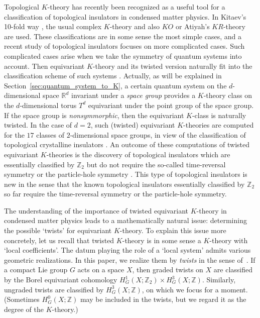 \documentclass[pdftex]{sigma}
\theoremstyle{definition}
\newcommand{\R}{\mathbb{R}}
\newcommand{\Z}{\mathbb{Z}}
\begin{document}
Topological $K$-theory has recently been recognized as a useful tool for a classif\/ication of topological insulators in condensed matter physics. In Kitaev's 10-fold way \cite{Ki}, the usual complex $K$-theory and also $KO$ or Atiyah's $KR$-theory are used. These classif\/ications are in some sense the most simple cases, and a recent study of topological insulators focuses on more complicated cases. Such complicated cases arise when we take the symmetry of quantum systems into account. Then equivariant $K$-theory and its twisted version naturally f\/it into the classif\/ication scheme of such systems \cite{F-M}. Actually, as will be explained in Section~\ref{sec:quantum_system_to_K}, a certain quantum system on the $d$-dimensional space $\R^d$ invariant under a \textit{space group} provides a $K$-theory class on the $d$-dimensional torus $T^d$ equivariant under the point group of the space group. If the space group is \textit{nonsymmorphic}, then the equivariant $K$-class is naturally twisted. In the case of $d = 2$, such (twisted) equivariant $K$-theories are computed for the $17$ classes of $2$-dimensional space groups, in view of the classif\/ication of topological crystalline insulators \cite{SSG2, SSG3}. An outcome of these computations of twisted equivariant $K$-theories is the discovery of topological insulators which are essentially classif\/ied by $\Z_2$ but do not require the so-called time-reversal symmetry or the particle-hole symmetry \cite{SSG1}. This type of topological insulators is new in the sense that the known topological insulators essentially classif\/ied by $\Z_2$ so far require the time-reversal symmetry or the particle-hole symmetry.

The understanding of the importance of twisted equivariant $K$-theory in condensed matter physics leads to a mathematically natural issue: determining the possible `twists' for equivariant $K$-theory. To explain this issue more concretely, let us recall that twisted $K$-theory \cite{D-K, R} is in some sense a $K$-theory with `local coef\/f\/icients'. The datum playing the role of a `local system' admits various geometric realizations. In this paper, we realize them by \textit{twists} in the sense of~\cite{FHT}. If a compact Lie group $G$ acts on a space $X$, then graded twists on $X$ are classif\/ied by the Borel equivariant cohomology $H^1_G(X; \Z_2) \times H^3_G(X; \Z)$. Similarly, ungraded twists are classif\/ied by $H^3_G(X; \Z)$, on which we focus for a moment. (Sometimes $H^0_G(X; \Z)$ may be included in the twists, but we regard it as the degree of the $K$-theory.)
\end{document}
